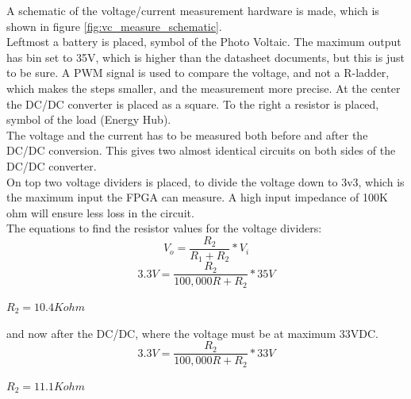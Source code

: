 A schematic of the voltage/current measurement hardware is made, which is shown in figure \ref{fig:vc_measure_schematic}.\\
Leftmost a battery is placed, symbol of the Photo Voltaic. The maximum output has bin set to 35V, which is higher than the datasheet documents, but this is just to be sure. A PWM signal is used to compare the voltage, and not a R-ladder, which makes the steps smaller, and the measurement more precise. At the center the DC/DC converter is placed as a square. To the right a resistor is placed, symbol of the load (Energy Hub).\\
The voltage and the current has to be measured both before and after the DC/DC conversion. This gives two almost identical circuits on both sides of the DC/DC converter.\\
On top two voltage dividers is placed, to divide the voltage down to 3v3, which is the maximum input the FPGA can measure. A high input impedance of 100K ohm will ensure less loss in the circuit. \\
The equations to find the resistor values for the voltage dividers:\\
\begin{equation}
V_o=\frac{R_2}{R_1+R_2}*V_i
\end{equation}
\begin{equation}
3.3V=\frac{R_2}{100,000R+R_2}*35V
\end{equation}
\begin{center}
$R_2=10.4K ohm$
\end{center}

and now after the DC/DC, where the voltage must be at maximum 33VDC.
\begin{equation}
3.3V=\frac{R_2}{100,000R+R_2}*33V
\end{equation}
\begin{center}
$R_2=11.1K ohm$
\end{center}



